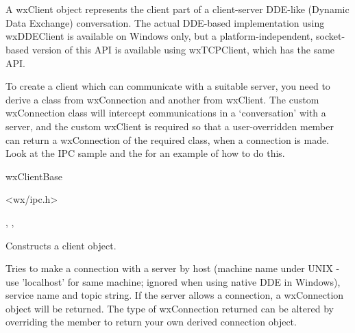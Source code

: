 \section{}\label{wxddeclient}

A wxClient object represents the client part of a client-server
DDE-like (Dynamic Data Exchange) conversation. The actual
DDE-based implementation using wxDDEClient is available on Windows
only, but a platform-independent, socket-based version of this
API is available using wxTCPClient, which has the same API.

To create a client which can communicate with a suitable server,
you need to derive a class from wxConnection and another from
wxClient. The custom wxConnection class will intercept
communications in a `conversation' with a server, and the custom
wxClient is required so that a user-overridden
member can return a wxConnection of the required class, when a
connection is made. Look at the IPC sample and the 
 for
an example of how to do this.


wxClientBase\\


<wx/ipc.h>


, 
, 




Constructs a client object.

\label{wxddeclientmakeconnection}


Tries to make a connection with a server by host (machine name
under UNIX - use 'localhost' for same machine; ignored when using
native DDE in Windows), service name and topic string. If the
server allows a connection, a wxConnection object will be
returned. The type of wxConnection returned can be altered by
overriding the 
member to return your own derived connection object.

